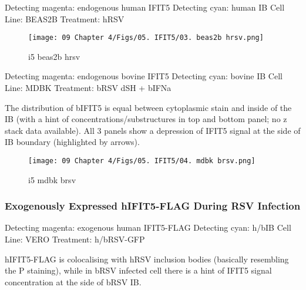 Detecting magenta: endogenous human IFIT5 \newline
Detecting cyan: human IB \newline
Cell Line: BEAS2B \newline
Treatment: hRSV \newline

\begin{figure}
    \centering
    \texttt{[image: 09 Chapter 4/Figs/05. IFIT5/03. beas2b hrsv.png]}
    \caption[i5 beas2b hrsv]{i5 beas2b hrsv}
    \label{fig:i5 beas2b hrsv}
\end{figure}

 \label{bIFIT5 Localisation During h/bRSV Infection}
Detecting magenta: endogenous bovine IFIT5 \newline
Detecting cyan: bovine IB \newline
Cell Line: MDBK \newline
Treatment: bRSV dSH + bIFNa \newline

The distribution of bIFIT5 is equal between cytoplasmic stain and inside of the IB (with a hint of concentrations/substructures in top and bottom panel; no z stack data available). All 3 panels show a depression of IFIT5 signal at the side of IB boundary (highlighted by arrows).

\begin{figure}
    \centering
    \texttt{[image: 09 Chapter 4/Figs/05. IFIT5/04. mdbk brsv.png]}
    \caption[i5 mdbk brsv]{i5 mdbk brsv}
    \label{fig:i5 mdbk brsv}
\end{figure}

\subsubsection{Exogenously Expressed hIFIT5-FLAG During RSV Infection} \label{Exogenously Expressed hIFIT5-FLAG During RSV Infection}
Detecting magenta: exogenous human IFIT5-FLAG \newline
Detecting cyan: h/bIB \newline
Cell Line: VERO \newline
Treatment: h/bRSV-GFP \newline

hIFIT5-FLAG is colocalising with hRSV inclusion bodies (basically resembling the P staining), while in bRSV infected cell there is a hint of IFIT5 signal concentration at the side of bRSV IB.

